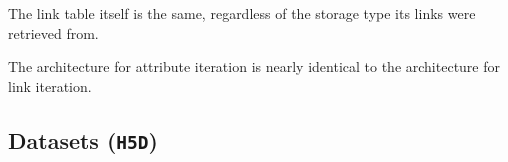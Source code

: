 \begin{itemize}
The link table itself is the same, regardless of the storage type its links were retrieved from.

The architecture for attribute iteration is nearly identical to the architecture for link iteration.

\end{itemize}

\subsection{Datasets (\texttt{H5D})}



